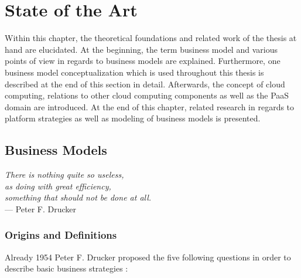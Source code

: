 \chapter{State of the Art}\label{ch:tf}%


Within this chapter, the theoretical foundations and related work of the thesis at hand are elucidated. At the beginning, the term business model and various points of view in regards to business models are explained. Furthermore, one business model conceptualization which is used throughout this thesis is described at the end of this section in detail. Afterwards, the concept of cloud computing, relations to other cloud computing components as well as the \ac{PaaS} domain are introduced. At the end of this chapter, related research in regards to platform strategies as well as modeling of business models is presented.

\section{Business Models}\label{ch:tf:bm}

\begin{flushright}{\slshape    
	There is nothing quite so useless,\\
	as doing with great efficiency, \\
	something that should not be done at all.} \\ \medskip
	--- Peter F. Drucker
\end{flushright}

\vspace*{-18pt}

\subsection{Origins and Definitions}

Already 1954 Peter F. Drucker proposed the five following questions in order to describe basic business strategies \citep[pp. 49-61]{Drucker1954}:

